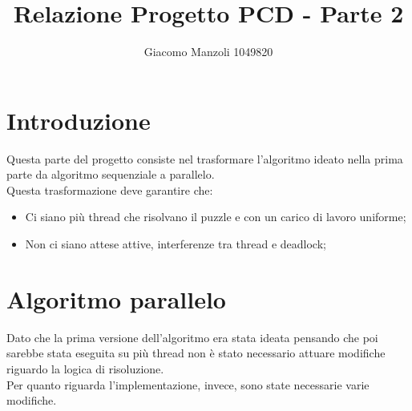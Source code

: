 \documentclass[a4paper, 11pt]{article}
\begin{document}
\title{Relazione Progetto PCD - Parte 2}
\author{Giacomo Manzoli 1049820}
\maketitle

\tableofcontents

\pagebreak

\section{Introduzione}
Questa parte del progetto consiste nel trasformare l'algoritmo ideato nella prima parte da algoritmo sequenziale a parallelo. \\
Questa trasformazione deve garantire che:
\begin{itemize}
\item Ci siano più thread che risolvano il puzzle e con un carico di lavoro uniforme;
\item Non ci siano attese attive, interferenze tra thread e deadlock;
\end{itemize}

\section{Algoritmo parallelo}
Dato che la prima versione dell'algoritmo era stata ideata pensando che poi sarebbe stata eseguita su più thread non è stato necessario attuare modifiche riguardo la logica di risoluzione. \\
Per quanto riguarda l'implementazione, invece, sono state necessarie varie modifiche.
\end{document}
